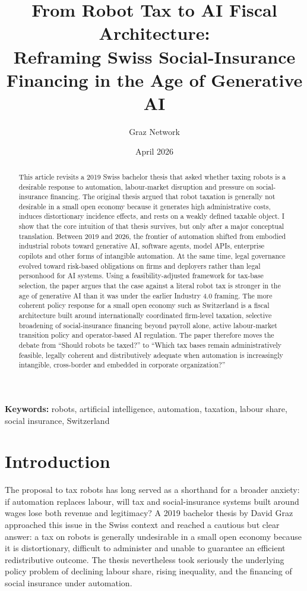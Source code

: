 \documentclass[11pt]{article}
\title{From Robot Tax to AI Fiscal Architecture:\\ \large Reframing Swiss Social-Insurance Financing in the Age of Generative AI}
\author{Graz Network}
\date{April 2026}
\begin{document}
\maketitle

\begin{abstract}
This article revisits a 2019 Swiss bachelor thesis that asked whether taxing robots is a desirable response to automation, labour-market disruption and pressure on social-insurance financing. The original thesis argued that robot taxation is generally not desirable in a small open economy because it generates high administrative costs, induces distortionary incidence effects, and rests on a weakly defined taxable object. I show that the core intuition of that thesis survives, but only after a major conceptual translation. Between 2019 and 2026, the frontier of automation shifted from embodied industrial robots toward generative AI, software agents, model APIs, enterprise copilots and other forms of intangible automation. At the same time, legal governance evolved toward risk-based obligations on firms and deployers rather than legal personhood for AI systems. Using a feasibility-adjusted framework for tax-base selection, the paper argues that the case against a literal robot tax is stronger in the age of generative AI than it was under the earlier Industry 4.0 framing. The more coherent policy response for a small open economy such as Switzerland is a fiscal architecture built around internationally coordinated firm-level taxation, selective broadening of social-insurance financing beyond payroll alone, active labour-market transition policy and operator-based AI regulation. The paper therefore moves the debate from ``Should robots be taxed?'' to ``Which tax bases remain administratively feasible, legally coherent and distributively adequate when automation is increasingly intangible, cross-border and embedded in corporate organization?''
\end{abstract}

\noindent\textbf{Keywords:} robots, artificial intelligence, automation, taxation, labour share, social insurance, Switzerland

\section{Introduction}
The proposal to tax robots has long served as a shorthand for a broader anxiety: if automation replaces labour, will tax and social-insurance systems built around wages lose both revenue and legitimacy? A 2019 bachelor thesis by David Graz approached this issue in the Swiss context and reached a cautious but clear answer: a tax on robots is generally undesirable in a small open economy because it is distortionary, difficult to administer and unable to guarantee an efficient redistributive outcome. The thesis nevertheless took seriously the underlying policy problem of declining labour share, rising inequality, and the financing of social insurance under automation.
\end{document}
